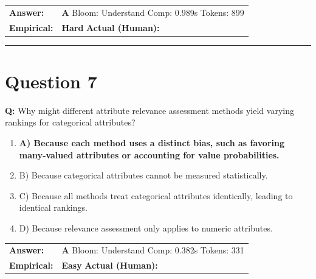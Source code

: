 \documentclass[9pt]{article}
\begin{document}
\begin{tabular}{@{}l p{10.5cm}@{}}
\textbf{Answer:} & \textbf{A} \hspace{1em} Bloom: Understand \hspace{1em} Comp: 0.989s \hspace{1em} Tokens: 899 \\
\textbf{Empirical:} & \textbf{Hard} \hspace{1em} \textbf{Actual (Human):} \underline{\hspace{5cm}}
\end{tabular}

\vspace{0.2cm}
\rule{\textwidth}{0.4pt}
\vspace{0.2cm}


\section*{Question 7}

\textbf{Q:} Why might different attribute relevance assessment methods yield varying rankings for categorical attributes?

\begin{enumerate}[label=\textbf{\alph{*})}, nosep]
    \item \textbf{A) Because each method uses a distinct bias, such as favoring many‑valued attributes or accounting for value probabilities.} %
    \item B) Because categorical attributes cannot be measured statistically.
    \item C) Because all methods treat categorical attributes identically, leading to identical rankings.
    \item D) Because relevance assessment only applies to numeric attributes.

\end{enumerate}

\begin{tabular}{@{}l p{10.5cm}@{}}
\textbf{Answer:} & \textbf{A} \hspace{1em} Bloom: Understand \hspace{1em} Comp: 0.382s \hspace{1em} Tokens: 331 \\
\textbf{Empirical:} & \textbf{Easy} \hspace{1em} \textbf{Actual (Human):} \underline{\hspace{5cm}}
\end{tabular}
\end{document}
